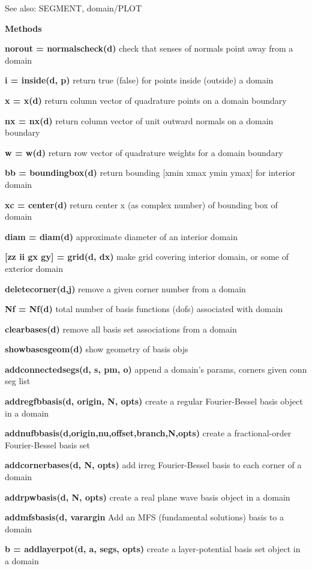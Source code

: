 See also: SEGMENT, domain/PLOT

\textbf{Methods}

\textbf{norout = normalscheck(d)} check that senses of normals point
away from a domain

\textbf{i = inside(d, p)} return true (false) for points inside
(outside) a domain

\textbf{x = x(d)} return column vector of quadrature points on a domain boundary

\textbf{nx = nx(d)} return column vector of unit outward normals on a
domain boundary

\textbf{w = w(d)} return row vector of quadrature weights for a domain
boundary

\textbf{bb = boundingbox(d)} return bounding [xmin xmax ymin ymax] for
interior domain

\textbf{xc = center(d)} return center x (as complex number) of bounding
box of domain 

\textbf{diam = diam(d)} approximate diameter of an interior domain

\textbf{[zz ii gx gy] = grid(d, dx)} make grid covering interior
domain, or some of exterior domain

\textbf{deletecorner(d,j)} remove a given corner number from a domain

\textbf{Nf = Nf(d)} total number of basis functions (dofs) associated
with domain

\textbf{clearbases(d)} remove all basis set associations from a domain

\textbf{showbasesgeom(d)} show geometry of basis objs

\textbf{addconnectedsegs(d, s, pm, o)} append a domain's params,
corners given conn seg list

\textbf{addregfbbasis(d, origin, N, opts)} create a regular
Fourier-Bessel basis object in a domain

\textbf{addnufbbasis(d,origin,nu,offset,branch,N,opts)} create a
fractional-order Fourier-Bessel basis set

\textbf{addcornerbases(d, N, opts)} add irreg Fourier-Bessel basis to
each corner of a domain

\textbf{addrpwbasis(d, N, opts)} create a real plane wave basis object
in a domain

\textbf{addmfsbasis(d, varargin} Add an MFS (fundamental solutions)
basis to a domain

\textbf{b = addlayerpot(d, a, segs, opts)} create a layer-potential
basis set object in a domain

